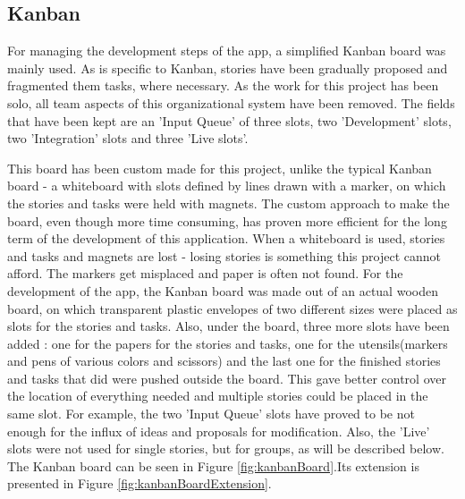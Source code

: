 \subsection{Kanban}

For managing the development steps of the app, a simplified Kanban board was
mainly used. As is specific to Kanban, stories have been gradually proposed and
fragmented them tasks, where necessary. As the work for this project has been
solo, all team aspects of this organizational system have been removed. The
fields that have been kept are an 'Input Queue' of three slots, two
'Development' slots, two 'Integration' slots and three 'Live slots'.\newline

This board has been custom made for this project, unlike the typical Kanban
board - a whiteboard with slots defined by lines drawn with a marker, on which
the stories and tasks were held with magnets. The custom approach to make the
board, even though more time consuming, has proven more efficient for the
long term of the development of this application. When a whiteboard is used,
stories and tasks and magnets are lost - losing stories is something this
project cannot afford. The markers get misplaced and paper is often not found.
For the development of the app, the Kanban board was made out of an actual
wooden board, on which transparent plastic envelopes of two different sizes were
placed as slots for the stories and tasks. Also, under the board, three more
slots have been added : one for the papers for the stories and tasks, one for
the utensils(markers and pens of various colors and scissors) and the last one
for the finished stories and tasks that did were pushed outside the board. This
gave better control over the location of everything needed and multiple stories
could be placed in the same slot. For example, the two 'Input Queue' slots have
proved to be not enough for the influx of ideas and proposals for modification.
Also, the 'Live' slots were not used for single stories, but for groups, as will
be described below. The Kanban board can be seen in Figure \ref{fig:kanbanBoard}.Its
extension is presented in Figure \ref{fig:kanbanBoardExtension}.\newline

